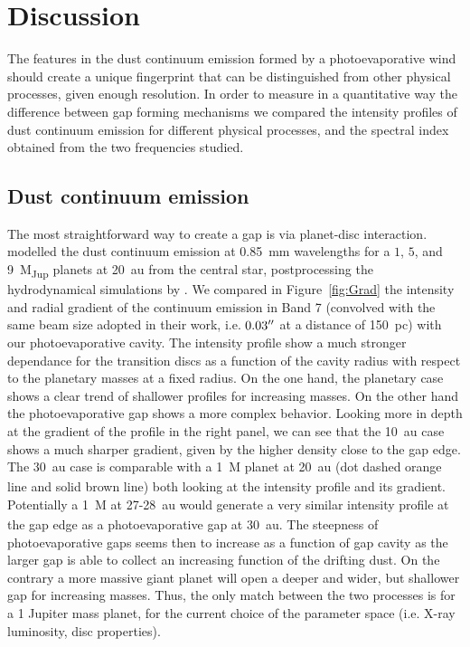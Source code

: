 \documentclass[fleqn,usenatbib]{mnras}
\begin{document}
\section{Discussion} \label{sec:discussion}
    The features in the dust continuum emission formed by a photoevaporative wind should create a unique fingerprint that can be distinguished from other physical processes, given enough resolution.
    In order to measure in a quantitative way the difference between gap forming mechanisms we compared the intensity profiles of dust continuum emission for different physical processes, and the spectral index obtained from the two frequencies studied.

    \subsection{Dust continuum emission}
    The most straightforward way to create a gap is via planet-disc interaction. \citet{Facchini2018} modelled the dust continuum emission at \SI{0.85}{mm} wavelengths for a $1$, $5$, and \SI{9}{M_{Jup}} planets at \SI{20}{au} from the central star, postprocessing the hydrodynamical simulations by \cite{Ovelar2016}. We compared in Figure~\ref{fig:Grad} the intensity and radial gradient of the continuum emission in Band 7 (convolved with the same beam size adopted in their work, i.e. $0.03 \hbox{$^{\prime\prime}$}$ at a distance of \SI{150}{pc}) with our photoevaporative cavity. The intensity profile show a much stronger dependance for the transition discs as a function of the cavity radius with respect to the planetary masses at a fixed radius. On the one hand, the planetary case shows a clear trend of shallower profiles for increasing masses. On the other hand the photoevaporative gap shows a more complex behavior. Looking more in depth at the gradient of the profile in the right panel, we can see that the \SI{10}{au} case shows a much sharper gradient, given by the higher density close to the gap edge. The \SI{30}{au} case is comparable with a \SI{1}{M_\J} planet at \SI{20}{au} (dot dashed orange line and solid brown line) both looking at the intensity profile and its gradient. Potentially a \SI{1}{M_\J} at 27-\SI{28}{au} would generate a very similar intensity profile at the gap edge as a photoevaporative gap at \SI{30}{au}. The steepness of photoevaporative gaps seems then to increase as a function of gap cavity as the larger gap is able to collect an increasing function of the drifting dust. On the contrary a more massive giant planet will open a deeper and wider, but shallower gap for increasing masses. Thus, the only match between the two processes is for a 1 Jupiter mass planet, for the current choice of the parameter space (i.e. X-ray luminosity, disc properties).
\end{document}
